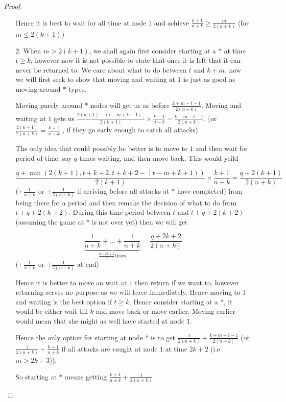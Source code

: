 \documentclass[a4paper,10pt]{article}
\theoremstyle{definition}
\theoremstyle{definition}
\theoremstyle{remark}
\theoremstyle{definition}
\begin{document}
\begin{proof}
\begin{itemize}
Hence it is best to wait for all time at node $1$ and achieve $\frac{k+1}{n+k} \geq \frac{m}{2(n+k)}$ (for $m \leq 2(k+1)$)

\item[2.] When $m > 2(k+1)$, we shall again first consider starting at a $*$ at time $t \geq k$, however now it is not possible to state that once it is left that it can never be returned to.
We care about what to do between $t$ and $k+m$, now we will first seek to show that moving and waiting at $1$ is just as good as moving around $*$ types.

Moving purely around $*$ nodes will get us as before $\frac{k+m-t-1}{2(n+k)}$.
Moving and waiting at $1$ gets us $\frac{2(k+1)-(t-m+k+1)_{+}}{2(k+1)} \times \frac{k+1}{n+k}=\frac{k+m-t-1}{2(n+k)}$. (or $\frac{2(k+1)}{2(n+k)}=\frac{k+1}{n+k}$ , if they go early enough to catch all attacks)

The only idea that could possibly be better is to move to $1$ and then wait for period of time, say $q$ times waiting, and then move back. This would yeild

$$\frac{q+ \min(2(k+1),t+k+2,t+k+2-(t-m+k+1))}{2(k+1)} \times \frac{k+1}{n+k} =\frac{q+2(k+1)}{2(n+k)} $$ ($+\frac{1}{n+k}$ or $+\frac{1}{2(n+k)}$ if arriving before all attacks at $*$ have completed) from being there for a period and then remake the decision of what to do from $t+q+2(k+2)$. During this time period between $t$ and $t+q+2(k+2)$ (assuming the game at $*$ is not over yet) then we will get

$$\underbrace{\frac{1}{n+k}+...+\frac{1}{n+k}}_{\frac{q+2k+2}{2} \text{times}}=\frac{q+2k+2}{2(n+k)}$$ ($+\frac{1}{n+k}$ or $+\frac{1}{2(n+k)}$
at end)

Hence it is better to move an wait at $1$ then return if we want to, however returning serves no purpose as we will leave immediately. Hence moving to $1$ and waiting is the best option if $t \geq k$. Hence consider starting at a $*$, it would be either wait till $k$ and move back or move earlier. Moving earlier would mean that she might as well have started at node $1$.

Hence the only option for starting at node $*$ is to get $\frac{1}{2(n+k)}+\frac{k+m-t-1}{2(n+k)}$ (or $\frac{1}{2(n+k)}+\frac{k+1}{n+k}$ if all attacks are caught at node $1$ at time $2k+2$ (i.e $m > 2k+3$)).

So starting at $*$ means getting $\frac{k+1}{n+k}+\frac{1}{2(n+k)}$ 

\end{itemize}



\end{proof}
\end{document}
